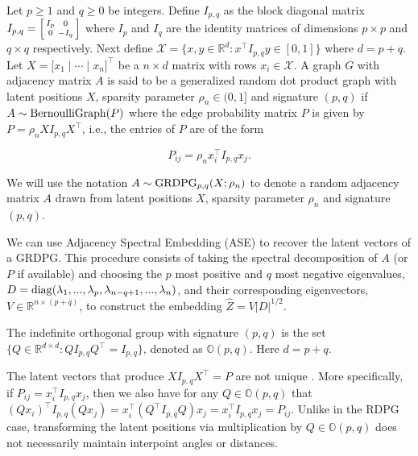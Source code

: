 \documentclass[12pt]{article}
\begin{document}
\begin{definition}
\label{grdpg}
Let $p \geq 1$ and $q \geq 0$ be integers. Define $I_{p,q}$ as the
block diagonal matrix $I_{p,q} = \Bigl[\begin{smallmatrix} I_{p} & 0
  \\ 0 & - I_{q} \end{smallmatrix} \Bigr]$ where $I_{p}$ and $I_{q}$
are the identity matrices of dimensions $p \times p$ and $q \times q$
respectively. Next define $\mathcal{X} = \{x, y \in \mathbb{R}^d : x^\top I_{p,q} y \in [0, 1]\}$ where $d = p + q$. 
Let $X = \bigl[x_1 \mid \cdots \mid x_n\bigr]^{\top}$ be
a $n \times d$ matrix with rows $x_i \in \mathcal{X}$. A graph $G$
with adjacency matrix $A$ is said to be a generalized random dot
product graph with latent positions $X$, sparsity parameter $\rho_n
\in (0,1]$
and signature $(p,q)$ if $A \sim \mathrm{BernoulliGraph}(P)$ where the edge probability
matrix $P$ is given
by $P = \rho_n X I_{p,q} X^{\top}$, i.e., the entries of $P$ are of
the form

$$P_{ij} = \rho_n x_i^{\top} I_{p,q} x_j.$$

\end{definition}
We will use the notation \(A \sim \mathrm{GRDPG}_{p,q}(X;\rho_n)\) to denote a random
adjacency matrix \(A\) drawn from latent positions \(X\), sparsity
parameter $\rho_n$ and signature
\((p, q)\). 

\begin{remark}
  \label{rem:ase}
We can use Adjacency Spectral Embedding (ASE) 
\citep{doi:10.1080/01621459.2012.699795} to recover the latent vectors of a GRDPG. 
This procedure consists of taking the spectral decomposition of $A$ 
(or $P$ if available) and choosing the $p$ most positive and $q$ most negative
eigenvalues, $D = \mathrm{diag}(\lambda_1, ..., \lambda_p, \lambda_{n - q + 1}, ..., \lambda_n)$, and their corresponding eigenvectors, $V \in \mathbb{R}^{n \times (p + q)}$,
to construct the embedding $\hat{Z} = V |D|^{1/2}$. 
\end{remark}

\begin{definition}
The indefinite orthogonal group with signature $(p, q)$ is
the set $\{Q \in \mathbb{R}^{d \times d} \colon Q I_{p, q} Q^{\top} = I_{p, q}\}$,
denoted as $\mathbb{O}(p, q)$. Here $d = p + q$. 
\end{definition}

\begin{remark}
  \label{rem:non_identifiable}
The latent vectors that produce $X I_{p,q} X^\top = P$ are not unique
\citep{rubindelanchy2017statistical}.
More specifically, if $P_{ij} = x_i^\top I_{p, q} x_j$, 
then we also have for any $Q \in \mathbb{O}(p, q)$ that
$(Q x_i)^\top I_{p, q} (Q x_j) = x_i^\top (Q^\top I_{p, q} Q) x_j =
x_i^\top I_{p, q} x_j = P_{ij}$.
Unlike in the RDPG case, transforming the latent positions via multiplication
by $Q \in \mathbb{O}(p, q)$ does not necessarily maintain interpoint angles or
distances.
\end{remark}
\end{document}
